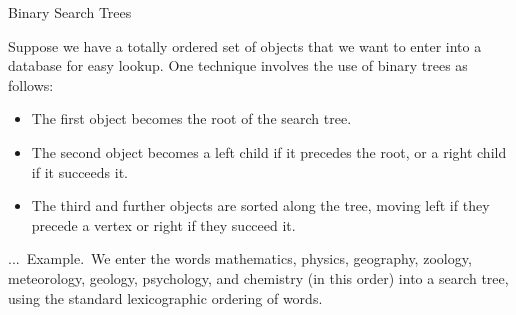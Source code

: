 \documentclass[smaller,hyperref={CJKbookmarks=true}]{beamer}
\newcounter{zhuo}[subsection]
\renewcommand{\thezhuo}{\thesection.\thesubsection.\arabic{zhuo}}
\newenvironment{EXAMPLE}{\stepcounter{zhuo}\alert{\!\thezhuo.~Example.\,}}{}
\begin{document}
\begin{frame}[c]{Binary Search Trees}
\begin{spacing}{1.15}
Suppose we have a totally ordered set of objects that we want to enter
into a database for easy lookup. One technique involves the use of binary
trees as follows:
\begin{itemize}
  \item[1.] The first object becomes the root of the search tree.
  \item[2.] The second object becomes a left child if it precedes the root, or a right child if it succeeds it.
  \item[3.] The third and further objects are sorted along the tree, moving left if they precede a vertex or right if they succeed it.
\end{itemize}
\begin{EXAMPLE}
We enter the words mathematics, physics, geography,
zoology, meteorology, geology, psychology, and chemistry (in this order)
into a search tree, using the standard lexicographic ordering of words.
\end{EXAMPLE}
\end{spacing}
\end{frame}
\end{document}
